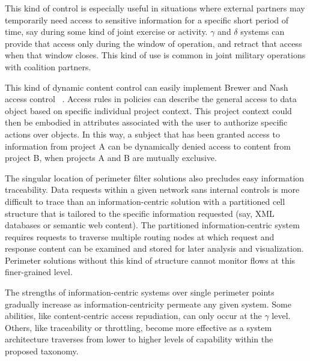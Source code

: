 This kind of control is especially useful in situations where external partners may temporarily need access to sensitive information for a specific short period of time, say during some kind of joint exercise or activity.  $\gamma$ and $\delta$ systems can provide that access only during the window of operation, and retract that access when that window closes.  This kind of use is common in joint military operations with coalition partners.

This kind of dynamic content control can easily implement Brewer and Nash access control ~\cite{Brewer89}.  Access rules in policies can describe the general access to data object based on specific individual project context.  This project context could then be embodied in attributes associated with the user to authorize specific actions over objects.  In this way, a subject that has been granted access to information from project A can be dynamically denied access to content from project B, when projects A and B are mutually exclusive.

The singular location of perimeter filter solutions also precludes easy information traceability.  Data requests within a given network sans internal controls is more difficult to trace than an information-centric solution with a partitioned cell structure that is tailored to the specific information requested (say, XML databases or semantic web content).  The partitioned information-centric system requires requests to traverse multiple routing nodes at which request and response content can be examined and stored for later analysis and visualization.  Perimeter solutions without this kind of structure cannot monitor flows at this finer-grained level.

The strengths of information-centric systems over single perimeter points gradually increase as information-centricity permeate any given system.  Some abilities, like content-centric access repudiation, can only occur at the $\gamma$ level.  Others, like traceability or throttling, become more effective as a system architecture traverses from lower to higher levels of capability within the proposed taxonomy.
